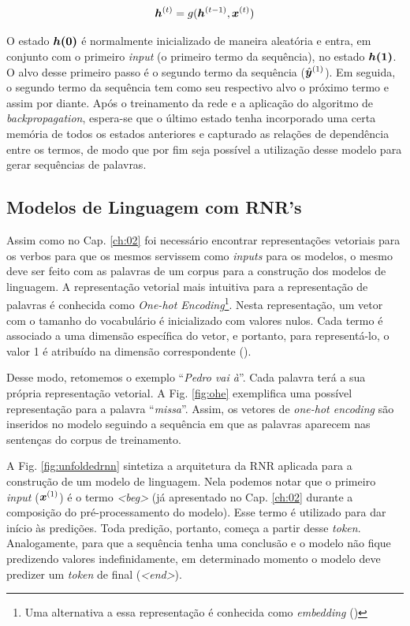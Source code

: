 \begin{equation}
\bm{h}^{(t)} = g(\bm{h}^{(t-1)}, \bm{x}^{(t)})
\label{eq:rnn}
\end{equation}


O estado $\bm{h(0)}$ é normalmente inicializado de maneira aleatória e entra, em conjunto com o primeiro \textit{input} (o primeiro termo da sequência), no estado $\bm{h(1)}$. O alvo desse primeiro passo é o segundo termo da sequência ($\hat{\bm{y}}^{(1)}$). Em seguida, o segundo termo da sequência tem como seu respectivo alvo o próximo termo e assim por diante. Após o treinamento da rede e a aplicação do algoritmo de \textit{backpropagation}, espera-se que o último estado tenha incorporado uma certa memória de todos os estados anteriores e capturado as relações de dependência entre os termos, de modo que por fim seja possível a utilização desse modelo para gerar sequências de palavras. 

\subsection{Modelos de Linguagem com RNR's}

Assim como no Cap. \ref{ch:02} foi necessário encontrar representações vetoriais para os verbos para que os mesmos servissem como \textit{inputs} para os modelos, o mesmo deve ser feito com as palavras de um corpus para a construção dos modelos de linguagem. A representação vetorial mais intuitiva para a representação de palavras é conhecida como \textit{One-hot Encoding}\footnote{Uma alternativa a essa representação é conhecida como \textit{embedding} (\cite{word2vec:2013})}. Nesta representação, um vetor com o tamanho do vocabulário é inicializado com valores nulos. Cada termo é associado a uma dimensão específica do vetor, e portanto, para representá-lo, o valor 1 é atribuído na dimensão correspondente (\cite{harris:2013}). 

Desse modo, retomemos o exemplo “\textit{Pedro vai à}”. Cada palavra terá a sua própria representação vetorial. A Fig. \ref{fig:ohe} exemplifica uma possível representação para a palavra “\textit{missa}”. Assim, os vetores de \textit{one-hot encoding} são inseridos no modelo seguindo a sequência em que as palavras aparecem nas sentenças do corpus de treinamento. 



A Fig. \ref{fig:unfoldedrnn} sintetiza a arquitetura da RNR aplicada para a construção de um modelo de linguagem. Nela podemos notar que o primeiro \textit{input} ($\bm{x}^{(1)}$) é o termo \textit{<beg>} (já apresentado no Cap. \ref{ch:02} durante a composição do pré-processamento do modelo). Esse termo é utilizado para dar início às predições. Toda predição, portanto, começa a partir desse \textit{token}. Analogamente, para que a sequência tenha uma conclusão e o modelo não fique predizendo valores indefinidamente, em determinado momento o modelo deve predizer um \textit{token} de final (\textit{<end>}).  

